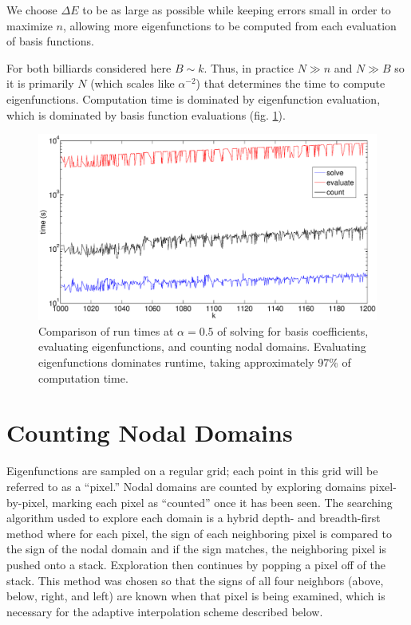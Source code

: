 \documentclass{report}
\begin{document}
We choose $\Delta E$ to be as large as possible while keeping errors small in order to maximize $n$, allowing more eigenfunctions to be computed from each evaluation of basis functions.

For both billiards considered here $B \sim k$. Thus, in practice $N \gg n$ and $N \gg B$ so it is primarily $N$ (which scales like $\alpha^{-2}$) that determines the time to compute eigenfunctions. Computation time is dominated by eigenfunction evaluation, which is dominated by basis function evaluations (fig. \ref{fig:timing}).

\begin{figure}
  \begin{center}
    \includegraphics[width=\textwidth]{figs/timing/timing_comp_1000_to_1200.eps}
    \caption{Comparison of run times at $\alpha = 0.5$ of solving for basis coefficients, evaluating eigenfunctions, and counting nodal domains. Evaluating eigenfunctions dominates runtime, taking approximately 97\% of computation time.}
    \label{fig:timing}
  \end{center}
\end{figure}


\section{Counting Nodal Domains}
\label{sec:counting}
Eigenfunctions are sampled on a regular grid; each point in this grid will be referred to as a ``pixel.'' Nodal domains are counted by exploring domains pixel-by-pixel, marking each pixel as ``counted'' once it has been seen. The searching algorithm usded to explore each domain is a hybrid depth- and breadth-first method where for each pixel, the sign of each neighboring pixel is compared to the sign of the nodal domain and if the sign matches, the neighboring pixel is pushed onto a stack. Exploration then continues by popping a pixel off of the stack. This method was chosen so that the signs of all four neighbors (above, below, right, and left) are known when that pixel is being examined, which is necessary for the adaptive interpolation scheme described below.
\end{document}
